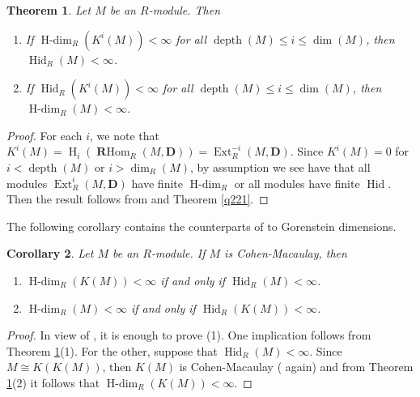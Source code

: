 \documentclass[11pt, a4paper,pagebackref]{amsart}
\numberwithin{equation}{section}
\newtheorem{theorem}{Theorem}[section]
\newtheorem{corollary}[theorem]{Corollary}
\theoremstyle{definition}
\newtheorem{remark and definition}[theorem]{Remark and Definition}
\newtheorem{remark and notation}[theorem]{Remark and Notation}
\newcommand\Ext{\operatorname{Ext}}
\newcommand\depth{\operatorname{depth}}
\newcommand\RHom{\operatorname{\mathbf{R}Hom}}
\begin{document}
\begin{theorem}\label{sq18z}
    Let $M$ be an $R$-module. Then
    \begin{enumerate}[\rm(1)]
        \item If $\operatorname{H-dim}_R(K^i(M))<\infty$ for all $\operatorname{depth}(M)\leq i \leq \dim(M)$, then $\operatorname{Hid}_R(M)<\infty$.
        \item If $\operatorname{Hid}_R(K^i(M))<\infty$ for all $\operatorname{depth}(M)\leq i \leq \dim(M)$, then $\operatorname{H-dim}_R(M)<\infty$.
    \end{enumerate}
\end{theorem}
\begin{proof}

For each $i$, we note that $K^i(M)=\operatorname{H}_{i}(\RHom_R(M, \boldsymbol{D}))=\Ext_R^{-i}(M, \boldsymbol{D})$. Since $K^i(M)=0$ for $i<\depth (M)$ or $i>\operatorname{dim}_R(M)$, by assumption we see have that all modules $\Ext_R^i(M,\boldsymbol{D})$ have finite $\operatorname{H-dim}_R$ or all modules have finite $\operatorname{Hid}$. Then the result follows from \cite[Proposition 4.2]{NumericalApectsofComplexesOfFiniteHomologicalDimensions} and Theorem \ref{q221}. 
\end{proof}


The following corollary contains the counterparts of \cite[Proposition 3.5(b)]{onthemuiinaminimalinjectiveresolution} to Gorenstein dimensions. 
\begin{corollary}\label{wqfa}
    Let $M$ be an $R$-module. If $M$ is Cohen-Macaulay, then
    \begin{enumerate}[\rm(1)]
        \item $\operatorname{H-dim}_R(K(M))<\infty$ if and only if $\operatorname{Hid}_R(M)<\infty$.
        \item $\operatorname{H-dim}_R(M)<\infty$ if and only if $\operatorname{Hid}_R(K(M))<\infty$. 
    \end{enumerate}
\end{corollary}
\begin{proof}
 In view of \cite[Theorem 1.14]{Sch98}, it is enough to prove (1). One implication follows from Theorem \ref{sq18z}(1). For the other, suppose that $\operatorname{Hid}_R(M)<\infty$. Since $M \cong K(K(M))$, then $K(M)$ is Cohen-Macaulay (\cite[Theorem 1.14]{Sch98} again) and from Theorem \ref{sq18z}(2) it follows that $\operatorname{H-dim}_R(K(M))<\infty$. 
\end{proof}
\end{document}
